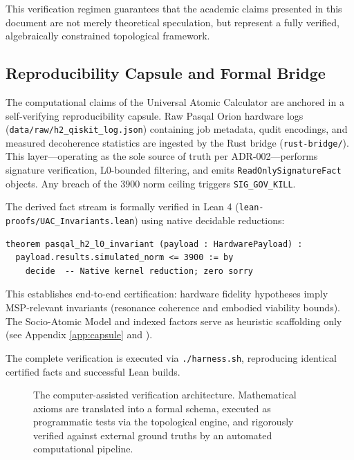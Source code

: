 This verification regimen guarantees that the academic claims presented in this document are not merely theoretical speculation, but represent a fully verified, algebraically constrained topological framework.

\subsection{Reproducibility Capsule and Formal Bridge}
The computational claims of the Universal Atomic Calculator are anchored in a self-verifying reproducibility capsule. Raw Pasqal Orion hardware logs (\texttt{data/raw/h2\_qiskit\_log.json}) containing job metadata, qudit encodings, and measured decoherence statistics are ingested by the Rust bridge (\texttt{rust-bridge/}). This layer—operating as the sole source of truth per ADR-002—performs signature verification, L0-bounded filtering, and emits \texttt{ReadOnlySignatureFact} objects. Any breach of the $3900$ norm ceiling triggers \texttt{SIG\_GOV\_KILL}.

The derived fact stream is formally verified in Lean 4 (\texttt{lean-proofs/UAC\_Invariants.lean}) using native decidable reductions:
\begin{lstlisting}[language=Lean]
theorem pasqal_h2_l0_invariant (payload : HardwarePayload) :
  payload.results.simulated_norm <= 3900 := by
    decide  -- Native kernel reduction; zero sorry
\end{lstlisting}

This establishes end-to-end certification: hardware fidelity hypotheses imply MSP-relevant invariants (resonance coherence and embodied viability bounds). The Socio-Atomic Model and indexed factors serve as heuristic scaffolding only (see Appendix \ref{app:capsule} and \socialdisclaimer).

The complete verification is executed via \texttt{./harness.sh}, reproducing identical certified facts and successful Lean builds.

\begin{figure}[h]
\centering
{}
\caption{The computer-assisted verification architecture. Mathematical axioms are translated into a formal schema, executed as programmatic tests via the topological engine, and rigorously verified against external ground truths by an automated computational pipeline.}
\label{fig:verification}
\end{figure}
